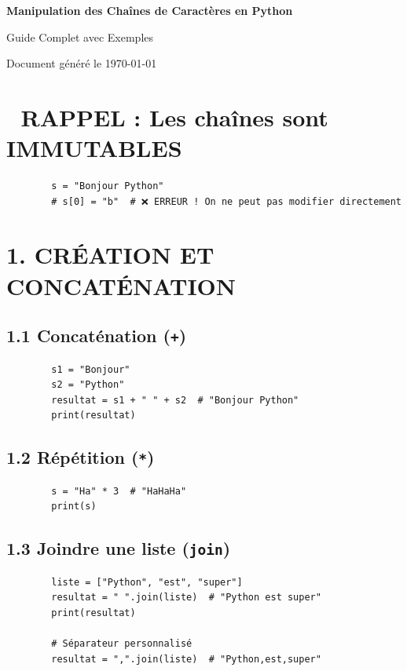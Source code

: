 \documentclass[12pt,a4paper]{article}
\begin{document}
	
	\begin{center}
		{\Huge \textbf{\color{bleu}Manipulation des Chaînes de Caractères en Python}}
		\vspace{0.5cm}
		
		{\Large \color{violet}Guide Complet avec Exemples}
		\vspace{0.5cm}
		
		{\color{gris}Document généré le \today}
	\end{center}
	
	\vspace{1cm}
	
	\section*{\color{rouge}📌 RAPPEL : Les chaînes sont IMMUTABLES}
	\begin{lstlisting}
		s = "Bonjour Python"
		# s[0] = "b"  # ❌ ERREUR ! On ne peut pas modifier directement
	\end{lstlisting}
	
	\section*{\color{orange}1. CRÉATION ET CONCATÉNATION}
	
	\subsection*{\color{cyan}1.1 Concaténation (\texttt{+})}
	\begin{lstlisting}
		s1 = "Bonjour"
		s2 = "Python"
		resultat = s1 + " " + s2  # "Bonjour Python"
		print(resultat)
	\end{lstlisting}
	
	\subsection*{\color{cyan}1.2 Répétition (\texttt{*})}
	\begin{lstlisting}
		s = "Ha" * 3  # "HaHaHa"
		print(s)
	\end{lstlisting}
	
	\subsection*{\color{cyan}1.3 Joindre une liste (\texttt{join})}
	\begin{lstlisting}
		liste = ["Python", "est", "super"]
		resultat = " ".join(liste)  # "Python est super"
		print(resultat)
		
		# Séparateur personnalisé
		resultat = ",".join(liste)  # "Python,est,super"
	\end{lstlisting}
	
\end{document}
